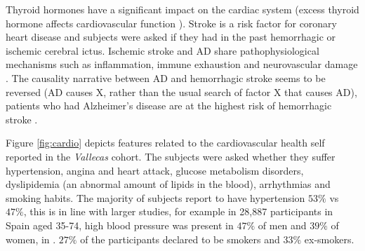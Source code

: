 \documentclass[11pt]{article}
\theoremstyle{definition}
\theoremstyle{remark}
\begin{document}
Thyroid hormones have a significant impact on the cardiac system (excess thyroid hormone affects cardiovascular function \cite{klein2007thyroid}).
Stroke is a risk factor for coronary heart disease and subjects were asked if they had in the past hemorrhagic or ischemic cerebral ictus. Ischemic stroke and AD share pathophysiological mechanisms such as inflammation, immune exhaustion and neurovascular damage \cite{lucke2015common}. 
The causality narrative between AD and hemorrhagic stroke seems to be reversed (AD causes X, rather than the usual search of factor X that causes AD), patients who had Alzheimer's disease are at the highest risk of hemorrhagic stroke \cite{wang2014newly}.

Figure \ref{fig:cardio} depicts features related to the cardiovascular health self reported in the \emph{Vallecas} cohort. The subjects were asked whether they suffer hypertension, angina and heart attack, glucose metabolism disorders, dyslipidemia (an abnormal amount of lipids in the blood), arrhythmias and smoking habits. The majority of subjects report to have hypertension $53\%$ vs $47\%$, this is in line with larger studies, for example in \cite{grau2011cardiovascular} 28,887 participants in Spain aged 35-74, high blood pressure was present in $47\%$ of men and $39\%$ of women, in \cite{lacruz2015prevalence}.
$27\%$ of the participants declared to be smokers and $33\%$ ex-smokers.




\end{document}
